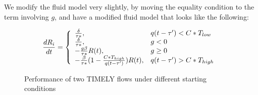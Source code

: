 We modify the fluid model very slightly, by moving the equality condition
to the term involving $g$, and have a modified fluid model that looks like the
following:

\begin{equation}
\frac{{dR_i}}{{dt}} = \left\{ \begin{array}{ll}
\frac{\delta }{{\tau *}}, & q(t - \tau ') < C*{T_{low}}\\
\frac{\delta }{{\tau *}}, & g < 0\\
 - \frac{{g\beta }}{{\tau *}}R(t), & g \ge 0\\
 - \frac{\beta }{{\tau *}}(1 - \frac{{C*{T_{high}}}}{{q(t - \tau ')}})R(t), & q(t - \tau ') > C*{T_{high}}
\end{array} \right.\\
\label{eq:timely_r_modified}
\end{equation}

\begin{figure}[t]
\center
{}
\caption{Performance of two TIMELY flows under different starting conditions}
\label{fig:timely_unstable}
\end{figure}

